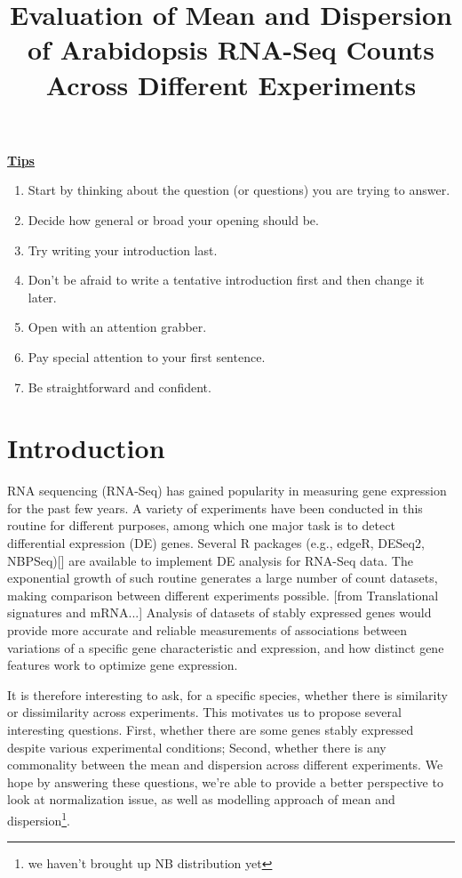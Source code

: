 \documentclass[paper=a4, fontsize=12.5pt]{scrartcl} %
\title{Evaluation of Mean and Dispersion of Arabidopsis RNA-Seq Counts Across Different Experiments}
\date{} %
\numberwithin{equation}{section} %
\numberwithin{figure}{section} %
\numberwithin{table}{section} %
\begin{document}
\maketitle

\textbf{\href{http://writingcenter.unc.edu/handouts/introductions/}{Tips}}
\begin{enumerate}
\item Start by thinking about the question (or questions) you are trying to answer.
\item Decide how general or broad your opening should be.
\item Try writing your introduction last.
\item Don't be afraid to write a tentative introduction first and then change it later.
\item Open with an attention grabber. 
\item Pay special attention to your first sentence. 
\item Be straightforward and confident.
\end{enumerate}

\section{Introduction}
RNA sequencing (RNA-Seq) has gained {} popularity in measuring gene  expression for the past few years. A variety of experiments  have been conducted in this routine for {} different purposes, among which one major task is to detect differential expression (DE) genes. Several R packages (e.g., edgeR, DESeq2, NBPSeq)[{\color{green}{reference needed}}] are available to implement DE analysis for RNA-Seq data. The exponential growth of such routine generates a large number of count datasets, making comparison between different experiments possible. 
[from Translational signatures and mRNA...]
Analysis of datasets of stably expressed genes would provide more accurate and reliable measurements of associations between variations of a specific gene characteristic and expression, and how distinct gene features work to optimize gene expression.

It is therefore interesting to ask, for a specific species, whether there is similarity or dissimilarity across experiments. This motivates us to propose several interesting questions. First, whether there are some genes stably expressed despite various experimental conditions; Second, whether there is any commonality between the mean and dispersion across different experiments. We hope by answering these questions, we're able to provide a better perspective to look at normalization issue, as well as modelling approach of mean and dispersion\footnote{we haven't brought up NB distribution yet}. \\
\end{document}
